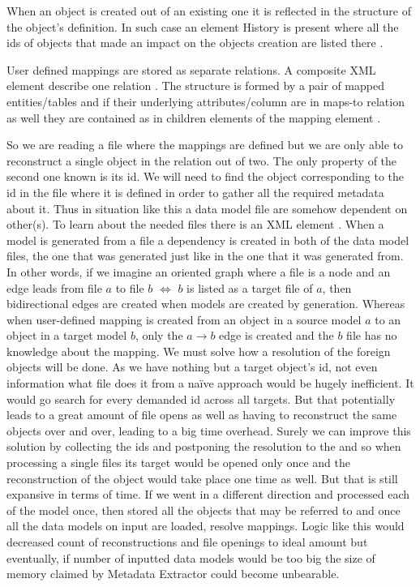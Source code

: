 When an object is created out of an existing one it is reflected in the structure of the object's definition. In such case an element History is present where all the ids of objects that made an impact on the objects creation are listed there .

User defined mappings are stored as separate relations. A composite XML element describe one relation . The structure is formed by a pair of mapped entities/tables  and if their underlying attributes/column are in maps-to relation as well they are contained as in children elements of the mapping element .

So we are reading a file where the mappings are defined but we are only able to reconstruct a single object in the relation out of two. 
The only property of the second one known is its id. We will need to find the object corresponding to the id in the file where it is defined in order to gather all the required metadata about it.
Thus in situation like this a data model file are somehow dependent on other(s).
To learn about the needed files there is an XML element .
When a model is generated from a file a dependency is created in both of the data model files, the one that was generated just like in the one that it was generated from. In other words, if we imagine an oriented graph where a file is a node and an edge leads from file $a$ to file $b$ $\iff$ $b$ is listed as a target file of $a$, then bidirectional edges are created when models are created by generation.
Whereas when user-defined mapping is created from an object in a source model $a$ to an object in a target model $b$, only the $a \rightarrow b$ edge is created and the $b$ file has no knowledge about the mapping.
We must solve how a resolution of the foreign objects will be done. As we have nothing but a target object's id, not even information what file does it from a naïve approach would be hugely inefficient. 
It would go search for every demanded id across all targets. 
But that potentially leads to a great amount of file opens as well as having to reconstruct the same objects over and over, leading to a big time overhead.
Surely we can improve this solution by collecting the ids and postponing the resolution to the and so when processing a single files its target would be opened only once and the reconstruction of the object would take place one time as well. But that is still expansive in terms of time.
If we went in a different direction and processed each of the model once, then stored all the objects that may be referred to and once all the data models on input are loaded, resolve mappings. Logic like this would decreased count of reconstructions and file openings to ideal amount but eventually, if number of inputted data models would be too big the size of memory claimed by Metadata Extractor could become unbearable.
